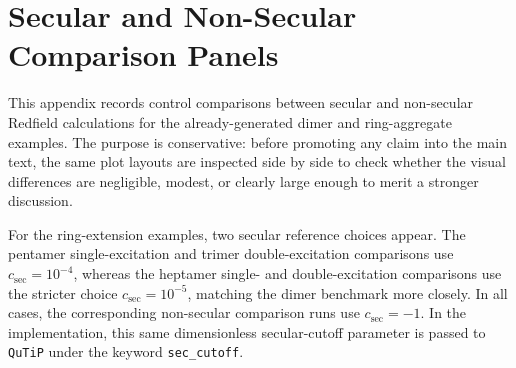 \providecommand{\heptamerSingleNonSecTimePath}{\detokenize{figures/svgs/extension_secular_comparison/30_155005_heptamer_ring_single/figures/time_all_signals_real_imag_heptamer_ring_single}}
\providecommand{\heptamerSingleNonSecFreqPath}{\detokenize{figures/svgs/extension_secular_comparison/30_155005_heptamer_ring_single/figures/freq_all_signals_real_imag_heptamer_ring_single}}
\providecommand{\heptamerDoubleSecTimePath}{\detokenize{figures/svgs/extension_secular_comparison/29_223415_heptamer_ring_double_secular_1e5/figures/time_all_signals_real_imag_heptamer_ring_double_secular_1e5}}
\providecommand{\heptamerDoubleSecFreqPath}{\detokenize{figures/svgs/extension_secular_comparison/29_223415_heptamer_ring_double_secular_1e5/figures/freq_all_signals_real_imag_heptamer_ring_double_secular_1e5}}
\providecommand{\heptamerDoubleNonSecTimePath}{\detokenize{figures/svgs/extension_secular_comparison/29_223409_heptamer_ring_double/figures/time_all_signals_real_imag_heptamer_ring_double}}
\providecommand{\heptamerDoubleNonSecFreqPath}{\detokenize{figures/svgs/extension_secular_comparison/29_223409_heptamer_ring_double/figures/freq_all_signals_real_imag_heptamer_ring_double}}
\providecommand{\tridecamerSingleTimePath}{\detokenize{figures/svgs/extension_secular_comparison/19_225943_tridecamer_ring_single/figures/time_all_signals_real_imag_abs_tridecamer_ring_single}}
\providecommand{\tridecamerSingleFreqPath}{\detokenize{figures/svgs/extension_secular_comparison/19_225943_tridecamer_ring_single/figures/freq_all_signals_real_imag_abs_tridecamer_ring_single}}

\chapter{Secular and Non-Secular Comparison Panels}
\label{app:extension_secular_comparison}

This appendix records control comparisons between secular and non-secular
Redfield calculations for the already-generated dimer and ring-aggregate
examples. The purpose is conservative: before promoting any claim into the main
text, the same plot layouts are inspected side by side to check whether the
visual differences are negligible, modest, or clearly large enough to merit a
stronger discussion.

For the ring-extension examples, two secular reference choices appear. The
pentamer single-excitation and trimer double-excitation comparisons use
\(c_{\mathrm{sec}}=10^{-4}\), whereas the heptamer single- and
double-excitation comparisons use the stricter choice \(c_{\mathrm{sec}}=10^{-5}\),
matching the dimer benchmark more closely. In all cases, the corresponding
non-secular comparison runs use \(c_{\mathrm{sec}}=-1\). In the implementation,
this same dimensionless secular-cutoff parameter is passed to \texttt{QuTiP}
under the keyword \texttt{sec\_cutoff}.

